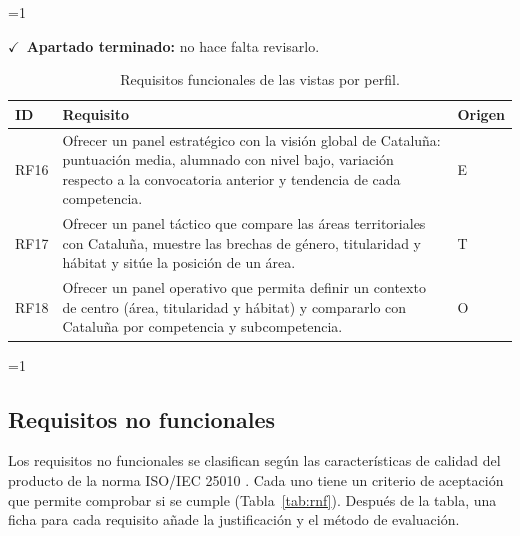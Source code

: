 \documentclass[12pt, a4paper, oneside]{report}
\newcommand{\mostrarterminados}{1}
\newenvironment{revisado}
  {\ifnum\mostrarterminados=1\relax\begin{cajarevisada}\noindent\colorbox{verdeterminado}{\parbox{\dimexpr\linewidth-2\fboxsep\relax}{\small$\checkmark$\ \textbf{Apartado terminado:} no hace falta revisarlo.}}\par\medskip\fi}
  {\ifnum\mostrarterminados=1\relax\end{cajarevisada}\fi}
\begin{document}
\begin{revisado}
\begin{table}[H]
\centering
\small
\renewcommand{\arraystretch}{1.1}
\begin{tabularx}{\textwidth}{@{} p{1.2cm} X p{2.2cm} @{}}
\toprule
\textbf{ID} & \textbf{Requisito} & \textbf{Origen} \\ \midrule
RF16 & Ofrecer un panel estratégico con la visión global de Cataluña: puntuación media, alumnado con nivel bajo, variación respecto a la convocatoria anterior y tendencia de cada competencia. & E \\ \addlinespace
RF17 & Ofrecer un panel táctico que compare las áreas territoriales con Cataluña, muestre las brechas de género, titularidad y hábitat y sitúe la posición de un área. & T \\ \addlinespace
RF18 & Ofrecer un panel operativo que permita definir un contexto de centro (área, titularidad y hábitat) y compararlo con Cataluña por competencia y subcompetencia. & O \\ \bottomrule
\end{tabularx}
\caption{Requisitos funcionales de las vistas por perfil.}
\label{tab:rf_perfiles}
\end{table}
\end{revisado}

\subsection{Requisitos no funcionales}
Los requisitos no funcionales se clasifican según las características de calidad del producto de la norma ISO/IEC 25010 \cite{iso25010_2011}. Cada uno tiene un criterio de aceptación que permite comprobar si se cumple (Tabla~\ref{tab:rnf}). Después de la tabla, una ficha para cada requisito añade la justificación y el método de evaluación.
\end{document}
